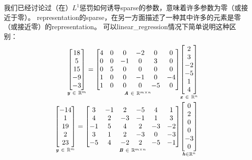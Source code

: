 我们已经讨论过（在）$L^1$惩罚如何诱导\gls{sparse}的参数，意味着许多参数为零（或接近于零）。
\gls{representation}的\gls{sparse}，在另一方面描述了一种其中许多的元素是零（或接近零）的\gls{representation}。
可以\gls{linear_regression}情况下简单说明这种区别：
\begin{align}
\underset{\boldsymbol{\mathit{y}} ~\in~ \mathbb{R}^m}{
 \begin{bmatrix}
  18 \\  5 \\ 15 \\ -9 \\ -3
 \end{bmatrix}} = 
 \underset{\boldsymbol{\mathit{A}} ~\in~ \mathbb{R}^{m \times n}}{
 \begin{bmatrix}
  4 & 0 & 0 & -2 & 0 & 0 \\
  0 & 0 & -1 & 0 & 3 & 0 \\
  0 & 5 & 0 & 0 & 0 & 0 \\
  1 & 0 & 0 & -1 & 0 & -4 \\
  1 & 0 & 0 & 0 & -5 & 0
 \end{bmatrix}} 
  \underset{\boldsymbol{\mathit{x}} ~\in~ \mathbb{R}^n}{
  \begin{bmatrix}
 2 \\ 3\\ -2\\ -5 \\ 1 \\ 4
 \end{bmatrix} }\\
 \underset{\boldsymbol{\mathit{y}} ~\in~ \mathbb{R}^m}{
 \begin{bmatrix}
  -14 \\  1 \\ 19 \\  2 \\ 23
 \end{bmatrix}} = 
 \underset{\boldsymbol{\mathit{B}} ~\in~ \mathbb{R}^{m \times n}}{
 \begin{bmatrix}
  3 & -1 & 2 & -5 & 4 & 1 \\
  4 & 2 & -3 & -1 & 1 & 3 \\
  -1 & 5 & 4 & 2 & -3 & -2 \\
  3 & 1 & 2 & -3 & 0 & -3 \\
  -5 & 4 & -2 & 2 & -5 & -1
 \end{bmatrix}} 
  \underset{\boldsymbol{\mathit{h}} \in \mathbb{R}^n}{
  \begin{bmatrix}
 0 \\ 2 \\ 0 \\ 0 \\ -3 \\ 0
 \end{bmatrix} }
\end{align}

